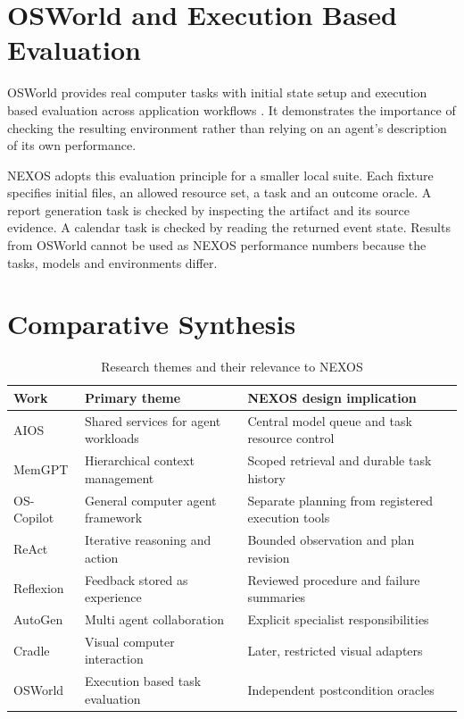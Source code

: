 \section{OSWorld and Execution Based Evaluation}
OSWorld provides real computer tasks with initial state setup and execution based evaluation across application workflows \cite{osworld}. It demonstrates the importance of checking the resulting environment rather than relying on an agent's description of its own performance.

NEXOS adopts this evaluation principle for a smaller local suite. Each fixture specifies initial files, an allowed resource set, a task and an outcome oracle. A report generation task is checked by inspecting the artifact and its source evidence. A calendar task is checked by reading the returned event state. Results from OSWorld cannot be used as NEXOS performance numbers because the tasks, models and environments differ.

\section{Comparative Synthesis}
\begin{table}[htbp]\centering\small
\caption{Research themes and their relevance to NEXOS}
\begin{tabularx}{\textwidth}{P{25mm}Y Y}
\toprule\textbf{Work} & \textbf{Primary theme} & \textbf{NEXOS design implication}\\\midrule
AIOS & Shared services for agent workloads & Central model queue and task resource control\\
MemGPT & Hierarchical context management & Scoped retrieval and durable task history\\
OS-Copilot & General computer agent framework & Separate planning from registered execution tools\\
ReAct & Iterative reasoning and action & Bounded observation and plan revision\\
Reflexion & Feedback stored as experience & Reviewed procedure and failure summaries\\
AutoGen & Multi agent collaboration & Explicit specialist responsibilities\\
Cradle & Visual computer interaction & Later, restricted visual adapters\\
OSWorld & Execution based task evaluation & Independent postcondition oracles\\\bottomrule
\end{tabularx}\end{table}

